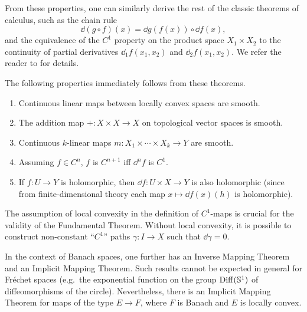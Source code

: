 From these properties, one can similarly derive the rest of the classic theorems of calculus, such as the chain rule
\[\dd(g\circ f)(x)=\dd g(f(x))\circ \dd f(x),\]
and the equivalence of the $C^1$ property on the product space $X_1\times X_2$ to the continuity of partial derivatives $\dd_1f(x_1,x_2)$ and $\dd_2 f(x_1,x_2)$. We refer the reader to \cite[Sec.~II]{Neeb} for details.

\begin{rem}
The following properties immediately follows from these theorems.
\begin{enumerate}[label=(\alph*)]
    \item Continuous linear maps between locally convex spaces are smooth.
    \item The addition map $+:X\times X\to X$ on topological vector spaces is smooth.
    \item Continuous $k$-linear maps $m:X_1\times\cdots\times X_k\to Y$ are smooth.
    \item Assuming $f\in C^n$, $f$ is $C^{n+1}$ iff $\dd^n f$ is $C^1$.
    \item If $f:U\to Y$ is holomorphic, then $\dd f:U\times X\to Y$ is also holomorphic (since from finite-dimensional theory each map $x\mapsto \dd f(x)(h)$ is holomorphic).
\end{enumerate}
\end{rem}


\begin{rem}
    The assumption of local convexity in the definition of $C^1$-maps is crucial for the validity of the Fundamental Theorem. Without local convexity, it is possible to construct non-constant ``$C^1$'' paths $\gamma:I\to X$ such that $\dd \gamma=0$.

    In the context of Banach spaces, one further has an Inverse Mapping Theorem and an Implicit Mapping Theorem. Such results cannot be expected in general for Fr\'echet spaces (e.g.\ the exponential function on the group $\operatorname{Diff}(\mathbb{S}^1)$ of diffeomorphisms of the circle). Nevertheless, there is an Implicit Mapping Theorem for maps of the type $E\to F$, where $F$ is Banach and $E$ is locally convex.
\end{rem}

